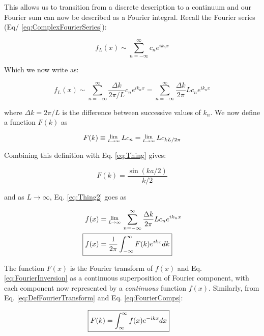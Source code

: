 This allows us to transition from a discrete description to a continuum and our Fourier sum can now be described as a Fourier integral. Recall the Fourier series (Eq/ \ref{eq:ComplexFourierSeries}):

\begin{equation}
	f_{L}(x) \sim \sum_{n=-\infty}^{\infty} c_n e^{i k_n x}
\end{equation}

Which we now write as:

\begin{equation}
	f_{L}(x) \sim \sum_{n=-\infty}^{\infty} \frac{\Delta k}{2\pi/L} c_n e^{i k_n x} = \sum_{n=-\infty}^{\infty} \frac{\Delta k}{2\pi} L c_n e^{i k_n x} 
	\label{eq:Thing2}
\end{equation}

where $\Delta k = 2\pi/L$ is the difference between successive values of $k_n$. We now define a function $F(k)$ as

\begin{equation}
	F(k) \equiv \Lim{L \rightarrow \infty} L c_n = \Lim{L \rightarrow \infty} L c_{kL/2 \pi}
	\label{eq:DefFourierTransform}
\end{equation}

Combining this definition with Eq. \ref{eq:Thing} gives:

\begin{equation}
	F(k) = \frac{\sin{(ka/2)}}{k/2}
\end{equation}

and as $L \rightarrow \infty$, Eq. \ref{eq:Thing2} goes as

\begin{align}
	f(x) &= \Lim{L \rightarrow \infty} \sum_{n=-\infty}^{\infty} \frac{\Delta k}{2\pi} L c_n e^{i k_n x} \\
	\Aboxed{f(x) &= \frac{1}{2\pi}\int_{-\infty}^{\infty}F(k) e^{ikx} dk}
\label{eq:FourierInversion}
\end{align}

The function $F(x)$ is the Fourier transform of $f(x)$ and Eq. \ref{eq:FourierInversion} as a continuous superposition of Fourier component, with each component now represented by a \emph{continuous} function $f(x)$. Similarly, from Eq. \ref{eq:DefFourierTransform} and Eq. \ref{eq:FourierComps}:

\begin{align}
	\Aboxed{F(k) &= \int_{\infty}^{\infty} f(x) e^{-i k x} dx}
	\label{eq:FourierTransform}
\end{align}


